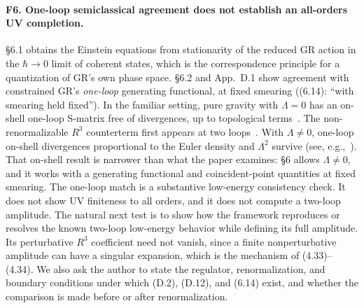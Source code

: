 \documentclass[11pt]{article}
\theoremstyle{remark}
\begin{document}
\paragraph{F6. One-loop semiclassical agreement does not establish an all-orders UV completion.}
\S6.1 obtains the Einstein equations from stationarity of the reduced GR action in the
$\hbar\to0$ limit of coherent states, which is the correspondence principle for a
quantization of GR's own phase space. \S6.2 and App.~D.1 show agreement with constrained
GR's \emph{one-loop} generating functional, at fixed smearing ((6.14): ``with smearing
held fixed''). In the familiar setting, pure gravity with $\Lambda=0$ has an on-shell one-loop
S-matrix free of divergences, up to topological terms~\cite{tHV}. The non-renormalizable
$R^3$ counterterm first appears at two loops~\cite{GS}. With $\Lambda\neq0$, one-loop
on-shell divergences proportional to the Euler density and $\Lambda^2$ survive (see,
e.g.,~\cite{BPS}). That on-shell result is
narrower than what the paper examines: \S6 allows $\Lambda\neq0$, and it works with a
generating functional and coincident-point quantities at fixed smearing. The one-loop match is a substantive low-energy consistency check. It does not show UV
finiteness to all orders, and it does not compute a two-loop amplitude. The natural next
test is to show how the framework reproduces or resolves the known two-loop low-energy
behavior while defining its full amplitude. Its perturbative $R^3$ coefficient need not
vanish, since a finite nonperturbative amplitude can have a singular expansion, which is
the mechanism of (4.33)--(4.34). We also ask the author to state the regulator,
renormalization, and boundary conditions under which (D.2), (D.12), and (6.14) exist, and
whether the comparison is made before or after renormalization.
\end{document}
